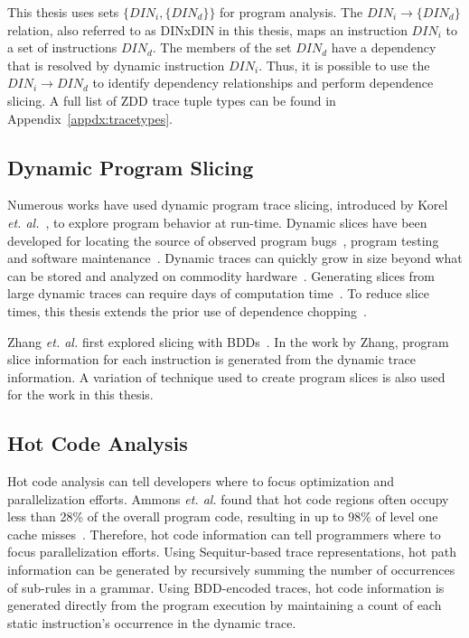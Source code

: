 \documentclass[defaultstyle,11pt]{thesis}
\begin{document}
This thesis uses sets $\{DIN_{i}, \{DIN_{d}\}\}$ for program analysis.
The $DIN_{i} \rightarrow \{DIN_{d}\}$ relation, also referred to as
{DINxDIN} in this thesis, maps an instruction $DIN_i$ to a set of
instructions $DIN_{d}$.  The members of the set $DIN_{d}$ have a
dependency that is resolved by dynamic instruction $DIN_i$.  Thus, it
is possible to use the $DIN_{i} \rightarrow DIN_{d}$ to identify
dependency relationships and perform dependence slicing. A full list
of ZDD trace tuple types can be found in
Appendix~\ref{appdx:tracetypes}.

\subsection{Dynamic Program Slicing}

Numerous works have used dynamic program trace slicing, introduced by
Korel \textit{et. al.}~\cite{korel:88:ipl}, to explore program
behavior at run-time.  Dynamic slices have been developed for locating
the source of observed program bugs~\cite{tip:94:cwi,agrawal:90:pldi},
program testing~\cite{gallager:91:se} and software
maintenance~\cite{kamkar:93:sm}. Dynamic traces can quickly grow in
size beyond what can be stored and analyzed on commodity
hardware~\cite{agrawal:90:pldi, zhang:04:micro, price:06:cal}.
Generating slices from large dynamic traces can require days of
computation time~\cite{agrawal:90:pldi}.  To reduce slice times, this
thesis extends the prior use of dependence
chopping~\cite{gupta:2005:ase,krinke:2004:sqc}.

Zhang \textit{et. al.} first explored slicing with
BDDs~\cite{zhang:04:icse}. In the work by Zhang, program slice
information for each instruction is generated from the dynamic trace
information. A variation of technique used to create program slices is
also used for the work in this thesis.

\subsection{Hot Code Analysis}

Hot code analysis can tell developers where to focus optimization and
parallelization efforts.  Ammons \textit{et. al.} found that hot code
regions often occupy less than 28\% of the overall program code,
resulting in up to 98\% of level one cache
misses~\cite{ammons:97:sigplan}.  Therefore, hot code information can
tell programmers where to focus parallelization efforts.  Using
Sequitur-based trace representations, hot path information can be
generated by recursively summing the number of occurrences of
sub-rules in a grammar. Using BDD-encoded traces, hot code information
is generated directly from the program execution by maintaining a
count of each static instruction's occurrence in the dynamic trace.
\end{document}
